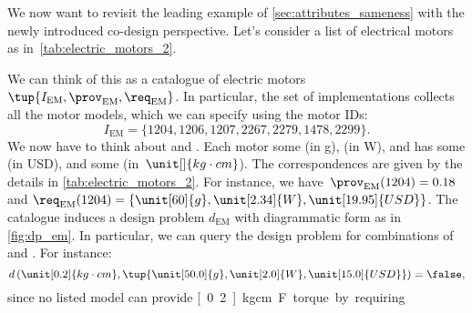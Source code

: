 \begin{example}
We now want to revisit the leading example of \cref{sec:attributes_sameness} with the newly introduced co-design perspective. Let's consider a list of electrical motors as in~\cref{tab:electric_motors_2}.
\begin{table}[h]
    \centering
    \caption{A simplified catalogue of motors.}
    \label{tab:electric_motors_2}
\end{table}

We can think of this as a catalogue of electric motors~$\tup{I_\mathrm{EM},\prov_\mathrm{EM},\req_\mathrm{EM}}$. In particular, the set of implementations collects all the motor models, which we can specify using the motor IDs:
\begin{equation}
    I_\mathrm{EM}=\{1204,1206,1207,2267,2279,1478,2299 \}.
\end{equation}
We now have to think about  and . Each motor  some  (in \unit[]{g}),  (in \unit[]{W}), and has some  (in USD), and  some  (in~$\unit[]{kg\cdot cm}$). The correspondences are given by the details in \cref{tab:electric_motors_2}. For instance, we have~$\prov_\mathrm{EM}(1204)=0.18$ and $\req_\mathrm{EM}(1204)=\{\unit[60]{g},\unit[2.34]{W},\unit[19.95]{USD}\}$. The catalogue induces a design problem $d_\mathrm{EM}$ with diagrammatic form as in \cref{fig:dp_em}. In particular, we can query the design problem for combinations of  and . For instance:
\begin{equation}
    d\left(\unit[0.2]{kg\cdot cm}, \tup{\unit[50.0]{g},\unit[2.0]{W},\unit[15.0]{USD}} \right)=\false,
\end{equation}
since no listed model can provide \unit[0.2]{kg\cdot cm} \F{torque} by requiring 


\end{example}
